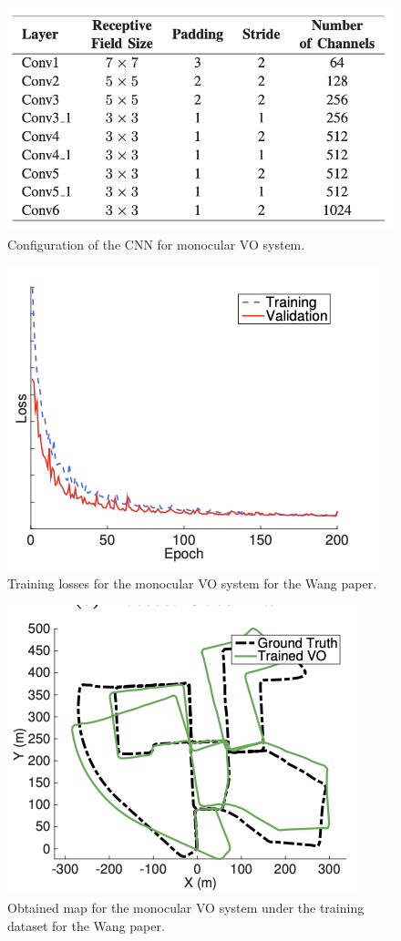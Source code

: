     \begin{figure}[h]
        \centering
        \includegraphics[width=0.65\columnwidth]{figuras/figura9.png}
        \caption{Configuration of the CNN for monocular VO system.}
        \label{fig:9}
    \end{figure}
    
    \begin{figure}[h]
        \centering
        \includegraphics[width=0.65\columnwidth]{figuras/figura10.png}
        \caption{Training losses for the monocular VO system for the Wang paper.}
        \label{fig:10}
    \end{figure}
    
    \begin{figure}[h]
        \centering
        \includegraphics[width=0.65\columnwidth]{figuras/figura11.png}
        \caption{Obtained map for the monocular VO system under the training dataset for the Wang paper.}
        \label{fig:11}
    \end{figure}        

